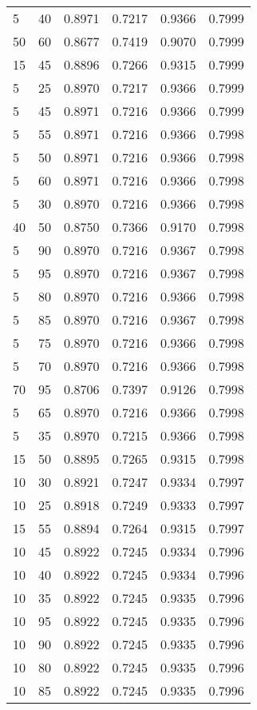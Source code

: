 \begin{center}
\begin{longtable}{|l|l|l|l|l|l|}
5  & 40 & 0.8971 & 0.7217 & 0.9366 & 0.7999 \\
50 & 60 & 0.8677 & 0.7419 & 0.9070 & 0.7999 \\
15 & 45 & 0.8896 & 0.7266 & 0.9315 & 0.7999 \\
5  & 25 & 0.8970 & 0.7217 & 0.9366 & 0.7999 \\
5  & 45 & 0.8971 & 0.7216 & 0.9366 & 0.7999 \\
5  & 55 & 0.8971 & 0.7216 & 0.9366 & 0.7998 \\
5  & 50 & 0.8971 & 0.7216 & 0.9366 & 0.7998 \\
5  & 60 & 0.8971 & 0.7216 & 0.9366 & 0.7998 \\
5  & 30 & 0.8970 & 0.7216 & 0.9366 & 0.7998 \\
40 & 50 & 0.8750 & 0.7366 & 0.9170 & 0.7998 \\
5  & 90 & 0.8970 & 0.7216 & 0.9367 & 0.7998 \\
5  & 95 & 0.8970 & 0.7216 & 0.9367 & 0.7998 \\
5  & 80 & 0.8970 & 0.7216 & 0.9366 & 0.7998 \\
5  & 85 & 0.8970 & 0.7216 & 0.9367 & 0.7998 \\
5  & 75 & 0.8970 & 0.7216 & 0.9366 & 0.7998 \\
5  & 70 & 0.8970 & 0.7216 & 0.9366 & 0.7998 \\
70 & 95 & 0.8706 & 0.7397 & 0.9126 & 0.7998 \\
5  & 65 & 0.8970 & 0.7216 & 0.9366 & 0.7998 \\
5  & 35 & 0.8970 & 0.7215 & 0.9366 & 0.7998 \\
15 & 50 & 0.8895 & 0.7265 & 0.9315 & 0.7998 \\
10 & 30 & 0.8921 & 0.7247 & 0.9334 & 0.7997 \\
10 & 25 & 0.8918 & 0.7249 & 0.9333 & 0.7997 \\
15 & 55 & 0.8894 & 0.7264 & 0.9315 & 0.7997 \\
10 & 45 & 0.8922 & 0.7245 & 0.9334 & 0.7996 \\
10 & 40 & 0.8922 & 0.7245 & 0.9334 & 0.7996 \\
10 & 35 & 0.8922 & 0.7245 & 0.9335 & 0.7996 \\
10 & 95 & 0.8922 & 0.7245 & 0.9335 & 0.7996 \\
10 & 90 & 0.8922 & 0.7245 & 0.9335 & 0.7996 \\
10 & 80 & 0.8922 & 0.7245 & 0.9335 & 0.7996 \\
10 & 85 & 0.8922 & 0.7245 & 0.9335 & 0.7996 \\

\end{longtable}
\end{center}
